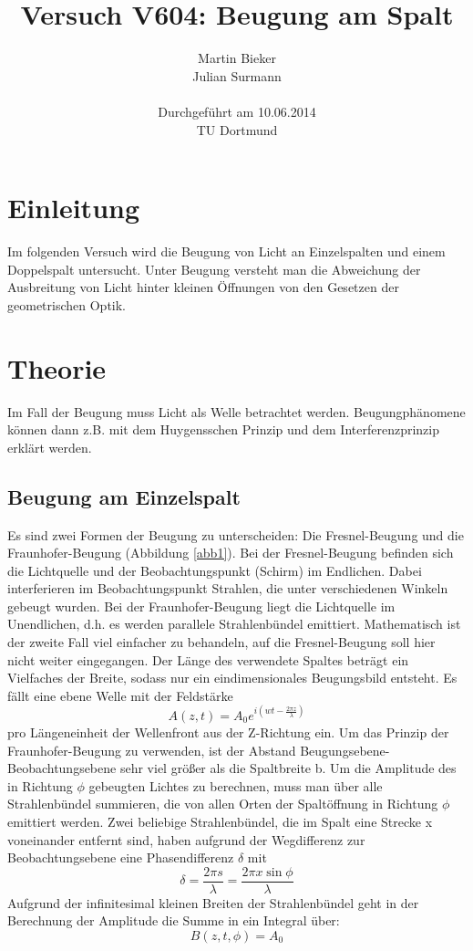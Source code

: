 \documentclass[11pt,ngerman,a4paper]{article}
\title{\textbf{Versuch V604: Beugung am Spalt}}
\author{Martin Bieker\\
		Julian Surmann\\
		\\
		Durchgef\"{u}hrt am 10.06.2014\\
		TU Dortmund}
\date{}
\begin{document}
\renewcommand\tablename{Tabelle}
\renewcommand\figurename{Abbildung}
\maketitle
\thispagestyle{empty}
\newpage
\clearpage
\setcounter{page}{1}


\section{Einleitung}
Im folgenden Versuch wird die Beugung von Licht an Einzelspalten und einem Doppelspalt untersucht. Unter Beugung versteht man die Abweichung der Ausbreitung von Licht hinter kleinen Öffnungen von den Gesetzen der geometrischen Optik.
\section{Theorie}
Im Fall der Beugung muss Licht als Welle betrachtet werden. Beugungphänomene können dann z.B. mit dem Huygensschen Prinzip und dem Interferenzprinzip erklärt werden. 
\subsection{Beugung am Einzelspalt}
Es sind zwei Formen der Beugung zu unterscheiden: Die Fresnel-Beugung und die Fraunhofer-Beugung (Abbildung \ref{abb1}).\newline
Bei der Fresnel-Beugung befinden sich die Lichtquelle und der Beobachtungspunkt (Schirm) im Endlichen. Dabei interferieren im Beobachtungspunkt Strahlen, die unter verschiedenen Winkeln gebeugt wurden. Bei der Fraunhofer-Beugung liegt die Lichtquelle im Unendlichen, d.h. es werden parallele Strahlenbündel emittiert. Mathematisch ist der zweite Fall viel einfacher zu behandeln, auf die Fresnel-Beugung soll hier nicht weiter eingegangen.
Der Länge des verwendete Spaltes beträgt ein Vielfaches der Breite, sodass nur ein eindimensionales Beugungsbild entsteht.
Es fällt eine ebene Welle mit der Feldstärke
\begin{equation}
A(z,t) = A_0 e^{i(wt- \frac{2\pi z}{ \lambda} )}
\end{equation}
pro Längeneinheit der Wellenfront aus der Z-Richtung ein.
Um das Prinzip der Fraunhofer-Beugung zu verwenden, ist der Abstand Beugungsebene-Beobachtungsebene sehr viel größer als die Spaltbreite b.\newline
Um die Amplitude des in Richtung $\phi$ gebeugten Lichtes zu berechnen, muss man über alle Strahlenbündel summieren, die von allen Orten der Spaltöffnung in Richtung $\phi$ emittiert werden. Zwei beliebige Strahlenbündel, die im Spalt eine Strecke x voneinander entfernt sind, haben aufgrund der Wegdifferenz zur Beobachtungsebene eine Phasendifferenz $\delta$ mit
\begin{equation}
\delta = \frac{2 \pi s}{\lambda} = \frac{2 \pi x \sin \phi}{\lambda}
\end{equation}
Aufgrund der infinitesimal kleinen Breiten der Strahlenbündel geht in der Berechnung der Amplitude die Summe in ein Integral über:
\begin{equation}
B (z, t, \phi) = A_0 
\end{equation}
\end{document}
